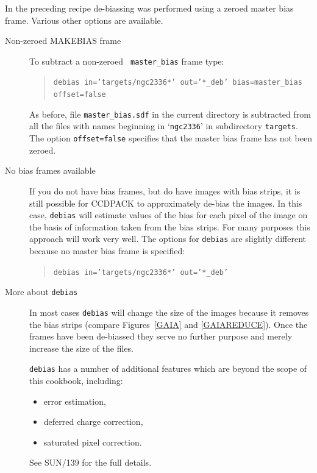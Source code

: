 \documentclass[twoside,11pt]{article}
\newcommand{\xref}[3]{#1}
\begin{document}
In the preceding recipe de-biassing was performed using a zeroed master
bias frame.  Various other options are available.

\begin{description}

  \item[Non-zeroed MAKEBIAS frame] To subtract a non-zeroed {\tt
   master\_bias} frame type:

  \begin{quote}
   {\tt debias~in='targets/ngc2336*'~out='*\_deb'~bias=master\_bias
   offset=false}
  \end{quote}

   As before, file {\tt master\_bias.sdf} in the current directory is
   subtracted from all the files with names beginning in `{\tt ngc2336}'
   in subdirectory {\tt targets}.  The option {\tt offset=false}
   specifies that the master bias frame has not been zeroed.

  \item[No bias frames available] If you do not have bias frames, but do
   have images with bias strips, it is still possible for CCDPACK to
   approximately de-bias the images.  In this case, {\tt debias} will
   estimate values of the bias for each pixel of the image on the basis of
   information taken from the bias strips. For many purposes this approach
   will work very well.  The options for {\tt debias} are slightly
   different because no master bias frame is specified:

  \begin{quote}
   {\tt debias in='targets/ngc2336*' out='*\_deb'}
  \end{quote}

  \item[More about {\tt debias}] In most cases {\tt debias} will change
   the size of the images because it removes the bias strips (compare
   Figures~\ref{GAIA} and \ref{GAIAREDUCE}).  Once the frames have
   been de-biassed they serve no further purpose and merely increase
   the size of the files.

   {\tt debias} has a number of additional features which are beyond the
   scope of this cookbook, including:

  \begin{itemize}

    \item error estimation,

    \item deferred charge correction,

    \item saturated pixel correction.

  \end{itemize}

   See \xref{SUN/139}{sun139}{}\/\cite{SUN139} for the full details.

\end{description}
\end{document}
